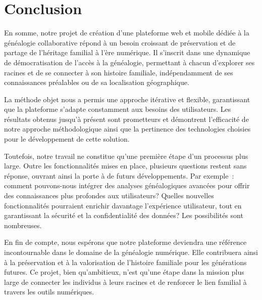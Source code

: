 \chapter*{Conclusion}
\label{chap:conclusion}
En somme, notre projet de création d’une plateforme web et mobile dédiée à la
généalogie collaborative répond à un besoin croissant de préservation et de
partage de l’héritage familial à l’ère numérique. Il s’inscrit dans une
dynamique de démocratisation de l’accès à la généalogie, permettant à chacun
d’explorer ses racines et de se connecter à son histoire familiale,
indépendamment de ses connaissances préalables ou de sa localisation
géographique.

La méthode objet nous a permis une approche itérative et flexible,
garantissant que la plateforme s’adapte constamment aux besoins des
utilisateurs. Les résultats obtenus jusqu’à présent sont prometteurs et
démontrent l’efficacité de notre approche méthodologique ainsi que la
pertinence des technologies choisies pour le développement de cette solution.

Toutefois, notre travail ne constitue qu’une première étape d’un processus plus
large. Outre les fonctionnalités mises en place, plusieurs questions restent
sans réponse, ouvrant ainsi la porte à de futurs développements. Par exemple :
comment pouvons-nous intégrer des analyses généalogiques avancées pour offrir
des connaissances plus profondes aux utilisateurs? Quelles nouvelles fonctionnalités
pourraient enrichir davantage l’expérience utilisateur, tout en garantissant
la sécurité et la confidentialité des données? Les possibilités sont nombreuses.

En fin de compte, nous espérons que notre plateforme deviendra une référence
incontournable dans le domaine de la généalogie numérique. Elle contribuera
ainsi à la préservation et à la valorisation de l’histoire familiale pour les
générations futures. Ce projet, bien qu’ambitieux, n’est qu’une étape dans la
mission plus large de connecter les individus à leurs racines et de renforcer
le lien familial à travers les outils numériques.

